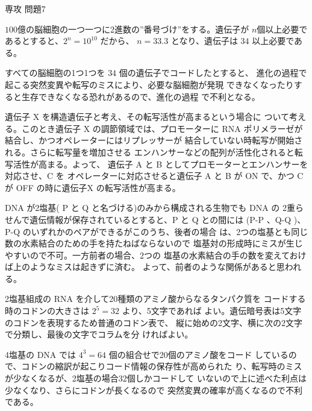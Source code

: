 \documentclass[fleqn]{jbook}
\begin{document}
\begin{answer}{専攻 問題7}{}

\begin{subanswers}
\SubAnswer
  \begin{subsubanswers}
  \SubSubAnswer
    $100$億の脳細胞の一つ一つに2進数の”番号づけ”をする。遺伝子が
    $n$個以上必要であるとすると、$2^{n} = 10^{10} $ だから、 
    $n=33.3$ となり、遺伝子は $ 34 $ 以上必要である。

  \SubSubAnswer
    すべての脳細胞の1つ1つを $ 34 $ 個の遺伝子でコードしたとすると、
    進化の過程で起こる突然変異や転写のミスにより、必要な脳細胞が発現
    できなくなったりすると生存できなくなる恐れがあるので、進化の過程
    で不利となる。

  \SubSubAnswer
    遺伝子 X を構造遺伝子と考え、その転写活性が高まるという場合に
    ついて考える。このとき遺伝子 X の調節領域では、プロモーターに
    RNA ポリメラーゼが結合し、かつオペレーターにはリプレッサーが
    結合していない時転写が開始される。さらに転写量を増加させる
    エンハンサーなどの配列が活性化されると転写活性が高まる。よって、
    遺伝子 A と B としてプロモーターとエンハンサーを対応させ、C を
    オペレーターに対応させると遺伝子 A と B が ON で、かつ C が OFF
    の時に遺伝子X の転写活性が高まる。 

  \end{subsubanswers}


\SubAnswer
  \begin{subsubanswers}
  \SubSubAnswer
    DNA が2塩基( P と Q と名づける)のみから構成される生物でも DNA の
    2重らせんで遺伝情報が保存されているとすると、P と Q との間には
    (P-P 、Q-Q )、P-Q  のいずれかのペアができるがこのうち、後者の場合
    は、2つの塩基とも同じ数の水素結合のための手を持たねばならないので
    塩基対の形成時にミスが生じやすいので不可。一方前者の場合、2つの
    塩基の水素結合の手の数を変えておけば上のようなミスは起きずに済む。
    よって、前者のような関係があると思われる。

  \SubSubAnswer
    2塩基組成の RNA を介して20種類のアミノ酸からなるタンパク質を
    コードする時のコドンの大きさは $ 2^5 = 32 $ より、5文字であれば
    よい。遺伝暗号表は5文字のコドンを表現するため普通のコドン表で、
    縦に始めの2文字、横に次の2文字で分類し、最後の文字でコラムを分
    ければよい。

  \SubSubAnswer
    4塩基の DNA では $ 4^3 = 64 $ 個の組合せで20個のアミノ酸をコード
    しているので、コドンの縮訳が起こりコード情報の保存性が高められた
    り、転写時のミスが少なくなるが、2塩基の場合32個しかコードして
    いないので上に述べた利点は少なくなり、さらにコドンが長くなるので
    突然変異の確率が高くなるので不利である。


\end{subsubanswers}
\end{subanswers}
\end{answer}
\end{document}

